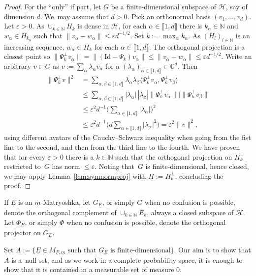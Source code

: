 \documentclass[pdftex]{sigma}%
\newcommand{\hilH}{\mathcal H}
\newcommand{\norm}[1]{\lVert #1\rVert}
\newcommand{\lN}{l\in \mathbb{N}}
\newcommand{\kN}{k\in \mathbb{N}}
\newcommand{\intt}[1]{\llbracket #1 \rrbracket}
\newcommand{\Id}{\mathrm{Id}}
\begin{document}
\begin{proof}
For the ``only'' if part, let $G$ be a finite-dimensional subspace of $\hilH$, say of dimension $d$. We~may assume that $d>0$. Pick an orthonormal basis $(v_1,\dots,v_d)$. Let $\varepsilon >0$. As $\cup_{\kN} H_k$ is dense in $\hilH$, for each $\alpha\in \intt{1,d}$ there is $k_\alpha\in \mathbb{N}$ and $w_\alpha\in H_{k_\alpha}$ such that $\norm{v_\alpha-w_\alpha}\leq \varepsilon d^{-1/2}$. Set $k:=\max_{\alpha} k_\alpha$. As $(H_l)_{\lN}$ is an increasing sequence, $w_\alpha\in H_k$ for each $\alpha\in \intt{1,d}$. The orthogonal projection is a closest point so $\norm{\Psi_k^{\perp}v_\alpha}=\norm{(\Id -\Psi_k)v_\alpha}\leq \norm{v_\alpha-w_\alpha}\leq \varepsilon d^{-1/2}$. Write an arbitrary $v \in G$ as $v:=\sum_\alpha \lambda_{\alpha} v_\alpha$ for a $(\lambda_{\alpha})_{\alpha\in \intt{1,d}} \in \mathbb{C}^d$. Then
\begin{align*}
\norm{\Psi_k^{\perp}v}^2 & = \sum_{\alpha,\beta \in \intt{1,d}}\overline{\lambda_{\alpha}} \lambda_{\beta} \big\langle \Psi_k^{\perp}v_\alpha,\Psi_k^{\perp}v_\beta\big\rangle
\\
& \leq \sum_{\alpha,\beta \in \intt{1,d}} |\lambda_{\alpha}|\,|\lambda_{\beta}|\norm{\Psi_k^{\perp}v_\alpha} |\norm{\Psi_k^{\perp}v_\beta}
\\
& \leq \varepsilon^2 d^{-1} \bigg(\sum_{\alpha\in \intt{1,d}} |\lambda_{\alpha}|\bigg)^2
\\
& \leq \varepsilon^2 d^{-1} \bigg(d\sum_{\alpha\in \intt{1,d}} |\lambda_{\alpha}|^2\bigg)=\varepsilon^2 \norm{v}^2 ,
\end{align*}
using different avatars of the Cauchy--Schwarz inequality when going from the fist line to the second, and then from the third line to the fourth. We have proven that for every $\varepsilon >0$ there is a $\kN$ such that the orthogonal projection on $H_k^{\perp}$ restricted to~$G$ has norm $\leq \varepsilon$. Noting that~$G$ is finite-dimensional, hence closed, we may apply Lemma~\ref{lem:symnormproj} with $H:=H_k^{\perp}$, concluding the proof.
\end{proof}

If $\underline{E}$ is an $\underline{m}$-Matryoshka, let $G_{\underline{E}}$, or simply $G$ when no confusion is possible, denote the orthogonal complement of $\cup_{\kN}E_k$, always a closed subspace of $\hilH$. Let $\Phi_{\underline{E}}$, or simply $\Phi$ when no confusion is possible, denote the orthogonal projector on $G_{\underline{E}}$.

Set $A:=\big\{\underline{E} \in M_{\underline{F},\underline{m}} \text{ such that } G_{\underline{E}}\text{ is finite-dimensional}\big\}$. Our aim is to show that $A$ is a~null set, and as we work in a complete probability space, it is enough to show that it is contained in a measurable set of measure $0$.
\end{document}
